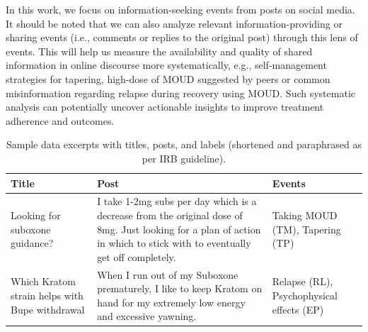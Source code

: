 \documentclass[letterpaper]{article} %
\begin{document}
In this work, we focus on information-seeking events from posts on social media. It should be noted that we can also analyze relevant information-providing or sharing events (i.e., comments or replies to the original post) through this lens of events. This will help us measure the availability and quality of shared information in online discourse more systematically, e.g., self-management strategies for tapering, high-dose of MOUD suggested by peers or common misinformation regarding relapse during recovery using MOUD.
Such systematic analysis can potentially uncover actionable insights to improve treatment adherence and outcomes.



\begin{table}[ht!]
\centering
\footnotesize
\begin{tabular}{L{3.5cm} L{10.5cm} C{2.8cm} }
\hline
\textbf{Title}&\textbf{Post}&\textbf{Events}\\
\hline                   
Looking for suboxone guidance? & I take 1-2mg subs per day which is a decrease from the original dose of 8mg. Just looking for a plan of action in which to stick with to eventually get off completely. & Taking MOUD (TM), Tapering (TP) \\
\midrule
 Which Kratom strain helps with Bupe withdrawal & When I run out of my Suboxone prematurely, I like to keep Kratom on hand for my extremely low energy and excessive yawning. & Relapse (RL), Psychophysical effects (EP) \\
\hline

\end{tabular}
\caption{Sample data excerpts with titles, posts, and labels (shortened and paraphrased as per IRB guideline).}
\label{samples}
\end{table}
\end{document}
